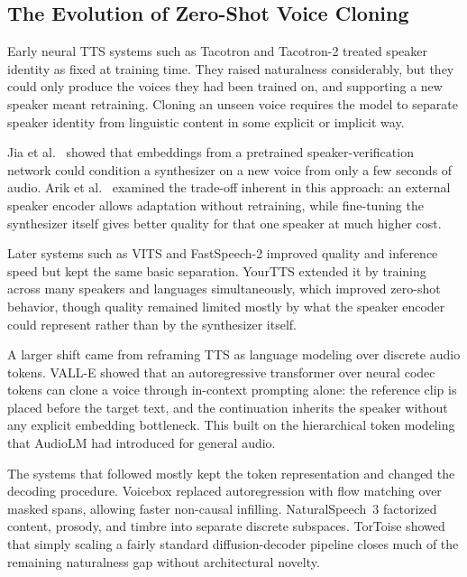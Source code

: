 \documentclass[conference]{IEEEtran}
\begin{document}
\subsection{The Evolution of Zero-Shot Voice Cloning}
\label{sec:related-evolution}

Early neural TTS systems such as Tacotron \cite{wang2017tacotron} and
Tacotron-2 \cite{shen2018natural} treated speaker identity as fixed at
training time. They raised naturalness considerably, but they could only
produce the voices they had been trained on, and supporting a new speaker
meant retraining. Cloning an unseen voice requires the model to separate
speaker identity from linguistic content in some explicit or implicit way.

Jia et al.~\cite{jia2018transfer} showed that embeddings from a pretrained
speaker-verification network could condition a synthesizer on a new voice
from only a few seconds of audio. Arik et al.~\cite{arik2018neural} examined
the trade-off inherent in this approach: an external speaker encoder allows
adaptation without retraining, while fine-tuning the synthesizer itself gives
better quality for that one speaker at much higher cost.

Later systems such as VITS \cite{kim2021vits} and FastSpeech-2
\cite{ren2020fastspeech2} improved quality and inference speed but kept the
same basic separation. YourTTS \cite{casanova2022yourtts} extended it by
training across many speakers and languages simultaneously, which improved
zero-shot behavior, though quality remained limited mostly by what the
speaker encoder could represent rather than by the synthesizer itself.

A larger shift came from reframing TTS as language modeling over discrete
audio tokens. VALL-E \cite{wang2023neural} showed that an autoregressive
transformer over neural codec tokens can clone a voice through in-context
prompting alone: the reference clip is placed before the target text, and the
continuation inherits the speaker without any explicit embedding bottleneck.
This built on the hierarchical token modeling that AudioLM
\cite{borsos2023audiolm} had introduced for general audio.

The systems that followed mostly kept the token representation and changed
the decoding procedure. Voicebox \cite{le2024voicebox} replaced autoregression
with flow matching over masked spans, allowing faster non-causal infilling.
NaturalSpeech~3 \cite{ju2024naturalspeech3} factorized content, prosody, and
timbre into separate discrete subspaces. TorToise \cite{betker2023better}
showed that simply scaling a fairly standard diffusion-decoder pipeline
closes much of the remaining naturalness gap without architectural novelty.
\end{document}

